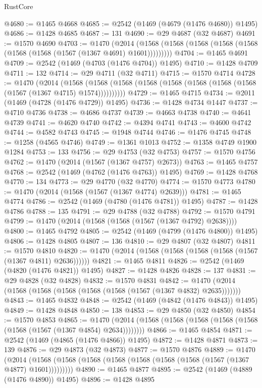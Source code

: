 \begin{lexlean}{RustCore}
\begin{coremodule}
@4680 := @1465 @4668
@4685 := @2542 (@1469 (@4679 (@1476 @4680)) @1495)
@4686 := @1428 @4685
@4687 := 131
@4690 := @29 @4687 (@32 @4687)
@4691 := @1570 @4690
@4703 := @1470
    (@2014 (@1568 (@1568 (@1568 (@1568 (@1568 (@1568 (@1568 (@1567 (@1367 @4691) @1601)))))))))
@4704 := @1465 @4691
@4709 := @2542 (@1469 (@4703 (@1476 @4704)) @1495)
@4710 := @1428 @4709
@4711 := 132
@4714 := @29 @4711 (@32 @4711)
@4715 := @1570 @4714
@4728 := @1470
    (@2014
      (@1568 (@1568 (@1568 (@1568 (@1568 (@1568 (@1568 (@1568 (@1567 (@1367 @4715) @1574))))))))))
@4729 := @1465 @4715
@4734 := @2011 (@1469 (@4728 (@1476 @4729)) @1495)
@4736 := @1428 @4734 @1447
@4737 := @4710 @4736
@4738 := @4686 @4737
@4739 := @4663 @4738
@4740 := @4641 @4739
@4741 := @4620 @4740
@4742 := @4394 @4741
@4743 := @4600 @4742
@4744 := @4582 @4743
@4745 := @1948 @4744
@4746 := @1476 @4745
@4748 := @1258 (@4565 @4746)
@4749 := @1361 @1013
@4752 := @1358 @4749 @1900 @1284
@4753 := 133
@4756 := @29 @4753 (@32 @4753)
@4757 := @1570 @4756
@4762 := @1470 (@2014 (@1567 (@1367 @4757) @2673))
@4763 := @1465 @4757
@4768 := @2542 (@1469 (@4762 (@1476 @4763)) @1495)
@4769 := @1428 @4768
@4770 := 134
@4773 := @29 @4770 (@32 @4770)
@4774 := @1570 @4773
@4780 := @1470 (@2014 (@1568 (@1567 (@1367 @4774) @2639)))
@4781 := @1465 @4774
@4786 := @2542 (@1469 (@4780 (@1476 @4781)) @1495)
@4787 := @1428 @4786
@4788 := 135
@4791 := @29 @4788 (@32 @4788)
@4792 := @1570 @4791
@4799 := @1470 (@2014 (@1568 (@1568 (@1567 (@1367 @4792) @2638))))
@4800 := @1465 @4792
@4805 := @2542 (@1469 (@4799 (@1476 @4800)) @1495)
@4806 := @1428 @4805
@4807 := 136
@4810 := @29 @4807 (@32 @4807)
@4811 := @1570 @4810
@4820 := @1470 (@2014 (@1568 (@1568 (@1568 (@1568 (@1567 (@1367 @4811) @2636))))))
@4821 := @1465 @4811
@4826 := @2542 (@1469 (@4820 (@1476 @4821)) @1495)
@4827 := @1428 @4826
@4828 := 137
@4831 := @29 @4828 (@32 @4828)
@4832 := @1570 @4831
@4842 := @1470 (@2014 (@1568 (@1568 (@1568 (@1568 (@1568 (@1567 (@1367 @4832) @2635)))))))
@4843 := @1465 @4832
@4848 := @2542 (@1469 (@4842 (@1476 @4843)) @1495)
@4849 := @1428 @4848
@4850 := 138
@4853 := @29 @4850 (@32 @4850)
@4854 := @1570 @4853
@4865 := @1470 (@2014 (@1568 (@1568 (@1568 (@1568 (@1568 (@1568 (@1567 (@1367 @4854) @2634))))))))
@4866 := @1465 @4854
@4871 := @2542 (@1469 (@4865 (@1476 @4866)) @1495)
@4872 := @1428 @4871
@4873 := 139
@4876 := @29 @4873 (@32 @4873)
@4877 := @1570 @4876
@4889 := @1470
    (@2014 (@1568 (@1568 (@1568 (@1568 (@1568 (@1568 (@1568 (@1567 (@1367 @4877) @1601)))))))))
@4890 := @1465 @4877
@4895 := @2542 (@1469 (@4889 (@1476 @4890)) @1495)
@4896 := @1428 @4895

\end{coremodule}
\end{lexlean}
